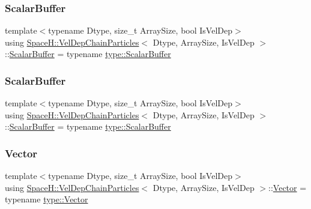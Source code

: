 \subsubsection{\texorpdfstring{Scalar\+Buffer}{ScalarBuffer}\hspace{0.1cm}{\footnotesize\ttfamily [1/2]}}
{\footnotesize\ttfamily template$<$typename Dtype, size\+\_\+t Array\+Size, bool Is\+Vel\+Dep$>$ \\
using \mbox{\hyperlink{class_space_h_1_1_vel_dep_chain_particles}{Space\+H\+::\+Vel\+Dep\+Chain\+Particles}}$<$ Dtype, Array\+Size, Is\+Vel\+Dep $>$\+::\mbox{\hyperlink{class_space_h_1_1_vel_indep_particles_abca40159a816385790d5a6fd19c1dc6d}{Scalar\+Buffer}} =  typename \mbox{\hyperlink{struct_space_h_1_1_proto_type_a62c491884996da10377d348a5aabad86}{type\+::\+Scalar\+Buffer}}}

\mbox{\label{class_space_h_1_1_vel_dep_chain_particles_a1b6480883ff99b7648c1a68a714af20f}} 
\subsubsection{\texorpdfstring{Scalar\+Buffer}{ScalarBuffer}\hspace{0.1cm}{\footnotesize\ttfamily [2/2]}}
{\footnotesize\ttfamily template$<$typename Dtype, size\+\_\+t Array\+Size, bool Is\+Vel\+Dep$>$ \\
using \mbox{\hyperlink{class_space_h_1_1_vel_dep_chain_particles}{Space\+H\+::\+Vel\+Dep\+Chain\+Particles}}$<$ Dtype, Array\+Size, Is\+Vel\+Dep $>$\+::\mbox{\hyperlink{class_space_h_1_1_vel_indep_particles_abca40159a816385790d5a6fd19c1dc6d}{Scalar\+Buffer}} =  typename \mbox{\hyperlink{struct_space_h_1_1_proto_type_a62c491884996da10377d348a5aabad86}{type\+::\+Scalar\+Buffer}}}

\mbox{\label{class_space_h_1_1_vel_dep_chain_particles_a954578905c7d7d1830c8e6eb95bc7eb6}} 
\subsubsection{\texorpdfstring{Vector}{Vector}\hspace{0.1cm}{\footnotesize\ttfamily [1/2]}}
{\footnotesize\ttfamily template$<$typename Dtype, size\+\_\+t Array\+Size, bool Is\+Vel\+Dep$>$ \\
using \mbox{\hyperlink{class_space_h_1_1_vel_dep_chain_particles}{Space\+H\+::\+Vel\+Dep\+Chain\+Particles}}$<$ Dtype, Array\+Size, Is\+Vel\+Dep $>$\+::\mbox{\hyperlink{class_space_h_1_1_vel_indep_particles_a61bbcfdb0dc7f99f3c68af69a755c935}{Vector}} =  typename \mbox{\hyperlink{struct_space_h_1_1_proto_type_a316b81f4660b2b4fab14a8e1f23b6089}{type\+::\+Vector}}}

